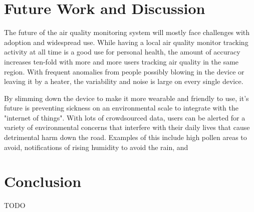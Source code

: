 \documentclass{sigchi}
\begin{document}
\section{Future Work and Discussion}
The future of the air quality monitoring system will mostly face challenges with adoption and widespread use. While having a local air quality monitor tracking activity at all time is a good use for personal health, the amount of accuracy increases ten-fold with more and more users tracking air quality in the same region. With frequent anomalies from people possibly blowing in the device or leaving it by a heater, the variability and noise is large on every single device. 

By slimming down the device to make it more wearable and friendly to use, it's future is preventing sickness on an environmental scale to integrate with the "internet of things". With lots of crowdsourced data, users can be alerted for a variety of environmental concerns that interfere with their daily lives that cause detrimental harm down the road. Examples of this include high pollen areas to avoid, notifications of rising humidity to avoid the rain, and 

\section{Conclusion}
TODO

\balance{}



\end{document}
